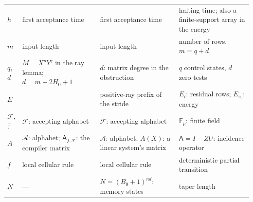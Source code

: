 \documentclass[11pt,letterpaper]{article}
\numberwithin{equation}{section}
\theoremstyle{definition}
\newcommand{\A}{\mathcal A}
\newcommand{\F}{\mathcal F}
\newcommand{\Fbb}{\mathbb F}
\newcommand{\Ann}{\mathsf{A}}
\begin{document}
\begin{longtable}{@{}P{0.07\textwidth}P{0.27\textwidth}P{0.27\textwidth}P{0.29\textwidth}@{}}
$h$ & first acceptance time & first acceptance time & halting time; also a finite-support array in the energy\\
$m$ & input length & input length & number of rows, $m=q+d$\\
$q$, $d$ & $M=X^pY^q$ in the ray lemma; $d=m+2H_0+1$ & $d$: matrix degree in the obstruction & $q$ control states, $d$ zero tests\\
$E$ & --- & positive-ray prefix of the stride & $E_i$: residual rows; $E_{v_0}$: energy\\
$\F$, $\Fbb$ & $\F$: accepting alphabet & $\F$: accepting alphabet & $\Fbb_p$: finite field\\
$A$ & $\A$: alphabet; $\mathsf A_{f,\F}$: the compiler matrix & $\A$: alphabet; $A(X)$: a linear system's matrix & $\Ann=I-ZU$: incidence operator\\
$f$ & local cellular rule & local cellular rule & deterministic partial transition\\
$N$ & --- & $N=(B_0+1)^{nd}$: memory states & taper length\\
\end{longtable}
\end{document}
